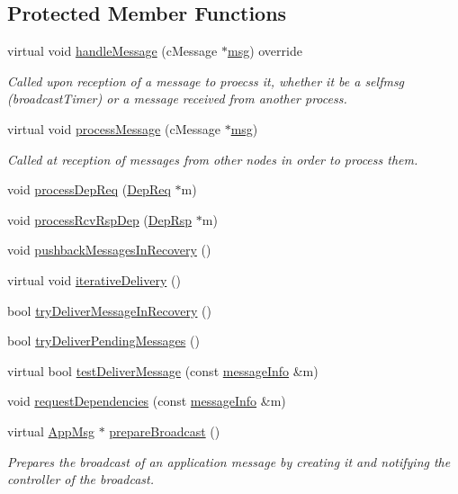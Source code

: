 \subsection*{Protected Member Functions}
\begin{DoxyCompactItemize}
\item 
virtual void \hyperlink{class_node_with_recovery_a901c89606b84898e13fe8a66228acd9f}{handle\+Message} (c\+Message $\ast$\hyperlink{_controller_8h_afa0f3b802fbc219228f7bb97996fa558}{msg}) override
\begin{DoxyCompactList}\small\item\em Called upon reception of a message to proecss it, whether it be a selfmsg (broadcast\+Timer) or a message received from another process. \end{DoxyCompactList}\item 
virtual void \hyperlink{class_node_with_recovery_a216c29d76ddb0e94cd5701ff208c7f5b}{process\+Message} (c\+Message $\ast$\hyperlink{_controller_8h_afa0f3b802fbc219228f7bb97996fa558}{msg})
\begin{DoxyCompactList}\small\item\em Called at reception of messages from other nodes in order to process them. \end{DoxyCompactList}\item 
void \hyperlink{class_node_with_recovery_a52ef51093d41e9b337987810311a7bc6}{process\+Dep\+Req} (\hyperlink{class_dep_req}{Dep\+Req} $\ast$m)
\item 
void \hyperlink{class_node_with_recovery_a34b5b66f90d85dd84b237b8cf81f2f7e}{process\+Rcv\+Rsp\+Dep} (\hyperlink{class_dep_rsp}{Dep\+Rsp} $\ast$m)
\item 
void \hyperlink{class_node_with_recovery_a261e41c94a93113168f8f81411b7c100}{pushback\+Messages\+In\+Recovery} ()
\item 
virtual void \hyperlink{class_node_with_recovery_a9b61912f38b62452584dc80bf261ef4e}{iterative\+Delivery} ()
\item 
bool \hyperlink{class_node_with_recovery_a87a1ce8071c9c587b878636f79163e7e}{try\+Deliver\+Message\+In\+Recovery} ()
\item 
bool \hyperlink{class_node_with_recovery_a462d825601a3c85ee4ef95be673790f8}{try\+Deliver\+Pending\+Messages} ()
\item 
virtual bool \hyperlink{class_node_with_recovery_aec147b3723b3dab00f9610453ba8daba}{test\+Deliver\+Message} (const \hyperlink{structures_8h_a7e7bdc1d2fff8a9436f2f352b2711ed6}{message\+Info} \&m)
\item 
void \hyperlink{class_node_with_recovery_a8b16bbc948fddc744a55ac548348a988}{request\+Dependencies} (const \hyperlink{structures_8h_a7e7bdc1d2fff8a9436f2f352b2711ed6}{message\+Info} \&m)
\item 
virtual \hyperlink{class_app_msg}{App\+Msg} $\ast$ \hyperlink{class_node_with_recovery_a33d8e8775fd69cb647b38a54b36e1ebe}{prepare\+Broadcast} ()
\begin{DoxyCompactList}\small\item\em Prepares the broadcast of an application message by creating it and notifying the controller of the broadcast. \end{DoxyCompactList}\end{DoxyCompactItemize}

